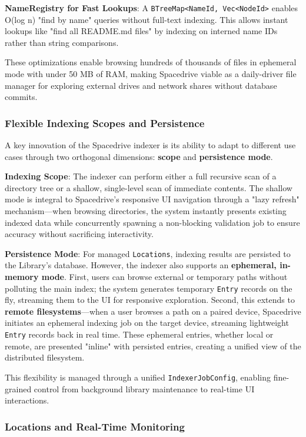 \documentclass[sigconf]{acmart}
\begin{document}
\textbf{NameRegistry for Fast Lookups}: A \texttt{BTreeMap<NameId, Vec<NodeId>} enables O(log n) "find by name" queries without full-text indexing. This allows instant lookups like "find all README.md files" by indexing on interned name IDs rather than string comparisons.

These optimizations enable browsing hundreds of thousands of files in ephemeral mode with under 50 MB of RAM, making Spacedrive viable as a daily-driver file manager for exploring external drives and network shares without database commits.

\subsubsection{Flexible Indexing Scopes and Persistence}
\label{sec:indexing-scopes}
A key innovation of the Spacedrive indexer is its ability to adapt to different use cases through two orthogonal dimensions: \textbf{scope} and \textbf{persistence mode}.

\textbf{Indexing Scope}: The indexer can perform either a full recursive scan of a directory tree or a shallow, single-level scan of immediate contents. The shallow mode is integral to Spacedrive's responsive UI navigation through a "lazy refresh" mechanism—when browsing directories, the system instantly presents existing indexed data while concurrently spawning a non-blocking validation job to ensure accuracy without sacrificing interactivity.

\textbf{Persistence Mode}: For managed \texttt{Locations}, indexing results are persisted to the Library's database. However, the indexer also supports an \textbf{ephemeral, in-memory mode}. First, users can browse external or temporary paths without polluting the main index; the system generates temporary \texttt{Entry} records on the fly, streaming them to the UI for responsive exploration. Second, this extends to \textbf{remote filesystems}—when a user browses a path on a paired device, Spacedrive initiates an ephemeral indexing job on the target device, streaming lightweight \texttt{Entry} records back in real time. These ephemeral entries, whether local or remote, are presented "inline" with persisted entries, creating a unified view of the distributed filesystem.

This flexibility is managed through a unified \texttt{IndexerJobConfig}, enabling fine-grained control from background library maintenance to real-time UI interactions.

\subsubsection{Locations and Real-Time Monitoring}
\end{document}
